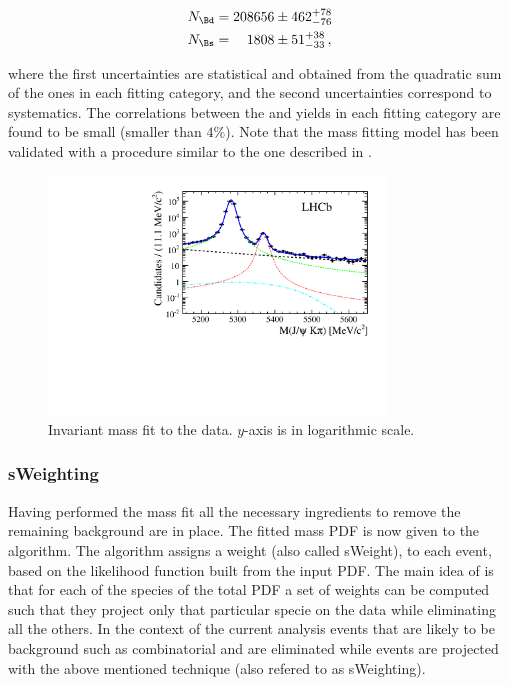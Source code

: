 \begin{align}
N_{\Bd} &= 208656  \pm  462 ^{+ 78	}_{- 76}\\
N_{\Bs} &= \phantom{00}1808  \pm   51 ^{+ 38	}_{- 33} \, ,
\label{signal_yields}
\end{align}

\noindent where the first uncertainties are statistical and obtained from the quadratic sum of the ones in each fitting category, 
and the second uncertainties correspond to systematics. The correlations between the \Bd and \Bs yields in each fitting category
are found to be small (smaller than $4\%$). Note that the mass fitting model has been validated with a procedure similar to the
one described in . 

\begin{figure}[h]
\begin{center}
  \includegraphics[width=0.8\textwidth]{Figures/Chapter4/mass_plot_simul_log.pdf}
  \caption{Invariant mass fit to the data. $y$-axis is in logarithmic scale.}
  \label{mass_plot}
\end{center}
\end{figure}

\subsubsection{sWeighting}
Having performed the mass fit all the necessary ingredients to remove the remaining background are in place. 
The fitted mass PDF is now given to the \sPlot algorithm. The algorithm assigns a weight (also called sWeight), to each event,
based on the likelihood function built from the input PDF. The main idea of \sPlot is that for each of the species of the total
PDF a set of weights can be computed such that they project only that particular specie on the data while eliminating all the others.  
In the context of the current analysis events that are likely to be background such as combinatorial and \LbJpsipK are
eliminated while \BJpsiKst events are projected with the above mentioned technique (also refered to as sWeighting).

